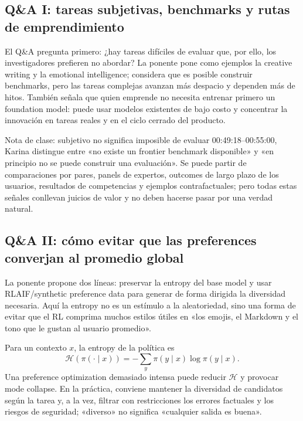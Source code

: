 \documentclass[a4paper]{article}
\begin{document}
\subsection{Q\&A I: tareas subjetivas, benchmarks y rutas de emprendimiento}

El Q\&A pregunta primero: ¿hay tareas difíciles de evaluar que, por ello, los investigadores prefieren no abordar? La ponente pone como ejemplos la creative writing y la emotional intelligence; considera que es posible construir benchmarks, pero las tareas complejas avanzan más despacio y dependen más de hitos. También señala que quien emprende no necesita entrenar primero un foundation model: puede usar modelos existentes de bajo costo y concentrar la innovación en tareas reales y en el ciclo cerrado del producto.

\begin{knowledgebox}{Nota de clase: subjetivo no significa imposible de evaluar}
00:49:18--00:55:00, Karina distingue entre «no existe un frontier benchmark disponible» y «en principio no se puede construir una evaluación». Se puede partir de comparaciones por pares, panels de expertos, outcomes de largo plazo de los usuarios, resultados de competencias y ejemplos contrafactuales; pero todas estas señales conllevan juicios de valor y no deben hacerse pasar por una verdad natural.
\end{knowledgebox}

\subsection{Q\&A II: cómo evitar que las preferences converjan al promedio global}

La ponente propone dos líneas: preservar la entropy del base model y usar RLAIF/synthetic preference data para generar de forma dirigida la diversidad necesaria. Aquí la entropy no es un estímulo a la aleatoriedad, sino una forma de evitar que el RL comprima muchos estilos útiles en «los emojis, el Markdown y el tono que le gustan al usuario promedio».

Para un contexto $x$, la entropy de la política es
\[
\mathcal{H}(\pi(\cdot\mid x))=-\sum_y \pi(y\mid x)\log \pi(y\mid x).
\]
Una preference optimization demasiado intensa puede reducir $\mathcal{H}$ y provocar mode collapse. En la práctica, conviene mantener la diversidad de candidatos según la tarea y, a la vez, filtrar con restricciones los errores factuales y los riesgos de seguridad; «diverso» no significa «cualquier salida es buena».
\end{document}
